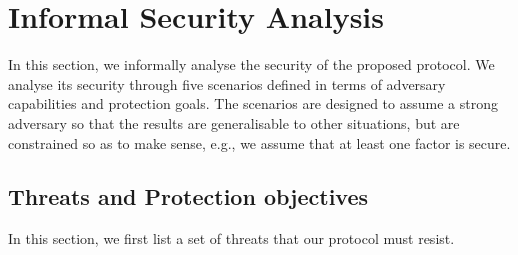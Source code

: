 

\section{Informal Security Analysis}
\label{sec:security}

In this section, we informally analyse the security of the proposed protocol. We analyse its security through five scenarios defined in terms of adversary capabilities and protection goals.
The scenarios are designed to assume a strong adversary so that the results are generalisable to other situations, but are constrained so as to make sense, e.g., we assume that at least one factor is secure.




\vspace{-4mm}
\subsection{Threats and Protection objectives}
In this section,  we first list a set of threats that our protocol must resist. 



